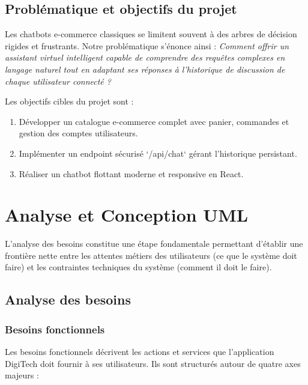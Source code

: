 \documentclass[12pt,a4paper,oneside]{report}
\begin{document}
\section{Problématique et objectifs du projet}
Les chatbots e-commerce classiques se limitent souvent à des arbres de décision rigides et frustrants. Notre problématique s'énonce ainsi : \textit{Comment offrir un assistant virtuel intelligent capable de comprendre des requêtes complexes en langage naturel tout en adaptant ses réponses à l'historique de discussion de chaque utilisateur connecté ?}

Les objectifs cibles du projet sont :
\begin{enumerate}
    \item Développer un catalogue e-commerce complet avec panier, commandes et gestion des comptes utilisateurs.
    \item Implémenter un endpoint sécurisé `/api/chat` gérant l'historique persistant.
    \item Réaliser un chatbot flottant moderne et responsive en React.
\end{enumerate}

\chapter{Analyse et Conception UML}

L'analyse des besoins constitue une étape fondamentale permettant d'établir une frontière nette entre les attentes métiers des utilisateurs (ce que le système doit faire) et les contraintes techniques du système (comment il doit le faire).

\section{Analyse des besoins}

\subsection{Besoins fonctionnels}
Les besoins fonctionnels décrivent les actions et services que l'application DigiTech doit fournir à ses utilisateurs. Ils sont structurés autour de quatre axes majeurs :
\end{document}
